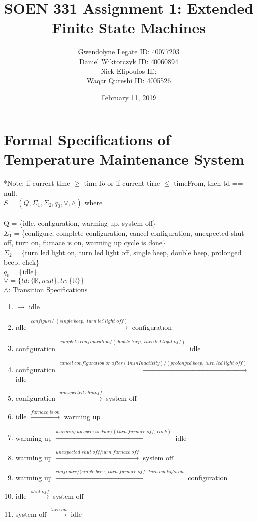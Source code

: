 \documentclass[12pt]{article}
\title{SOEN 331 Assignment 1: Extended Finite State Machines}
\date{February 11, 2019}
\author{Gwendolyne Legate ID: 40077203\\ Daniel Wiktorczyk ID: 40060894 \\Nick Elipoulos ID:\\ Waqar Qureshi ID: 4005526 }
\begin{document}
\maketitle
\section{Formal Specifications of Temperature Maintenance System}
*Note: if current time $\geq$ timeTo or if current time $\leq$ timeFrom, then td == null.\\

$S=(Q, \Sigma_{1}, \Sigma_{2}, q_{0}, \vee, \wedge)$ where\\
\\
Q = \{idle, configuration, warming up, system off\}\\
$\Sigma_{1}=$\{configure, complete configuration, cancel configuration, unexpected shut off, turn on, furnace is on, warming up cycle is done\}\\
$\Sigma_{2}=$\{turn led light on, turn led light off, single beep, double beep, prolonged beep, click\} \\
$q_{0}=$\{idle\}\\
$\vee=\{td:\{\mathbb{R}, null\}, tr:\{\mathbb{R}\}\}$\\
$\wedge$: Transition Specifications
\begin{enumerate}
\item $\rightarrow$ idle
\item idle $\xrightarrow{configure/\;(single\;beep,\;turn\;led\;light\;off)}$ configuration
\item configuration $\xrightarrow{complete\;configuration/(double\;beep,\;turn\;led\;light\;off)}$ idle
\item configuration $\xrightarrow{cancel\;configuration\;or\;after(1minInactivity)/(prolonged\;beep,\;turn\;led\;light\;off)}$ idle
\item configuration $\xrightarrow{unexpected\;shutoff}$ system off
\item idle $\xrightarrow{furnace\;is\;on}$ warming up
\item warming up $\xrightarrow{warming\;up\;cycle\;is\;done/(turn\;furnace\;off,\;click)}$ idle
\item warming up $\xrightarrow{unexpected\;shut\;off/turn\;furnace\;off}$ system off
\item warming up $\xrightarrow{configure/(single\;beep,\;turn\;furnace\;off,\;turn\;led\;light\;on}$ configuration
\item idle $\xrightarrow{shut\;off}$ system off
\item system off $\xrightarrow{turn\;on}$ idle
\end{enumerate}
\end{document}
